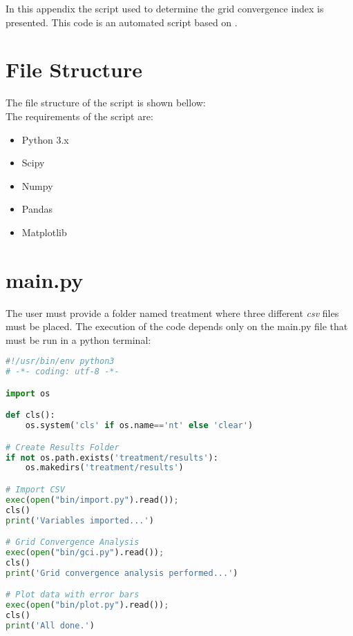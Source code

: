 \documentclass[../main.tex]{subfiles}
\begin{document}
\noindent
In this appendix the script used to determine the grid convergence index is presented. This code is an automated script based on \textcite{celik2008}.
\section{File Structure}
\noindent
The file structure of the script is shown bellow:
\\
\noindent
The requirements of the script are:
\begin{itemize}
\item Python 3.x
\item Scipy
\item Numpy
\item Pandas
\item Matplotlib
\end{itemize}
\section{main.py}
The user must provide a folder named treatment where three different \textit{csv} files must be placed. The execution of the code depends only on the main.py file that must be run in a python terminal:

\begin{lstlisting}[language=python]
#!/usr/bin/env python3
# -*- coding: utf-8 -*-

import os

def cls():
    os.system('cls' if os.name=='nt' else 'clear')

# Create Results Folder
if not os.path.exists('treatment/results'):
    os.makedirs('treatment/results')

# Import CSV
exec(open("bin/import.py").read());
cls()
print('Variables imported...')

# Grid Convergence Analysis
exec(open("bin/gci.py").read());
cls()
print('Grid convergence analysis performed...')

# Plot data with error bars
exec(open("bin/plot.py").read());
cls()
print('All done.')
\end{lstlisting}
\end{document}
